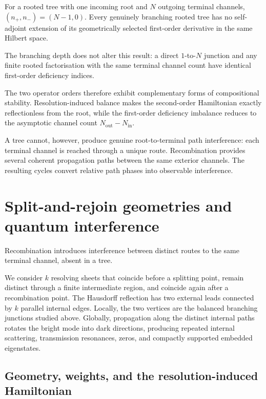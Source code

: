 \documentclass[11pt]{article}
\theoremstyle{plain}
\theoremstyle{definition}
\begin{document}
For a rooted tree with one incoming root and \(N\) outgoing terminal
channels,
\((n_+,n_-) = (N-1,0)\).
Every genuinely branching rooted tree has no self-adjoint extension of
its geometrically selected first-order derivative in the same Hilbert
space.

The branching depth does not alter this result: a direct \(1\)-to-\(N\)
junction and any finite rooted factorisation with the same terminal channel
count have identical first-order deficiency indices.

The two operator orders therefore exhibit complementary forms of
compositional stability. Resolution-induced balance makes the
second-order Hamiltonian exactly reflectionless from the root, while the
first-order deficiency imbalance reduces to the asymptotic channel count
\(N_{\mathrm{out}}-N_{\mathrm{in}}\).

A tree cannot, however, produce genuine root-to-terminal path interference:
each terminal channel is reached through a unique route. Recombination
provides several coherent propagation paths between the same exterior
channels. The resulting cycles convert relative path phases into observable
interference.
\section{Split-and-rejoin geometries and quantum interference}
\label{sec:split-rejoin}

Recombination introduces interference between distinct routes to the same terminal channel, absent in a tree.

We consider \(k\) resolving sheets that coincide before a splitting point,
remain distinct through a finite intermediate region, and coincide again
after a recombination point. The Hausdorff reflection has two external leads
connected by \(k\) parallel internal edges. Locally, the two vertices are
the balanced branching junctions studied above. Globally, propagation along
the distinct internal paths rotates the bright mode into dark directions,
producing repeated internal scattering, transmission resonances, zeros, and
compactly supported embedded eigenstates.

\subsection{Geometry, weights, and the resolution-induced Hamiltonian}
\label{subsec:split-rejoin-geometry}
\label{subsec:split-rejoin-metric}
\label{subsec:split-rejoin-vertex-conditions}
\end{document}

